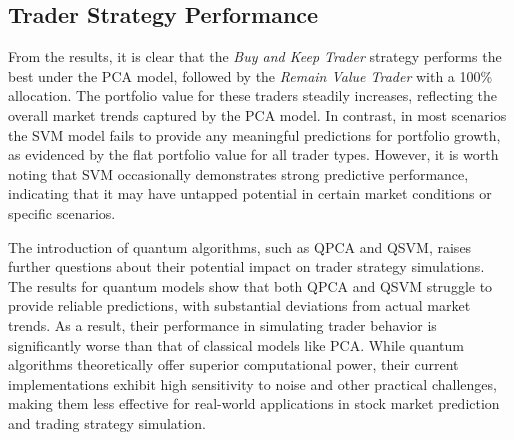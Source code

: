 \documentclass[journal]{IEEEtran}
\begin{document}
\subsection{Trader Strategy Performance}

From the results, it is clear that the \textit{Buy and Keep Trader} strategy performs the best under the PCA model, followed by the \textit{Remain Value Trader} with a 100\% allocation. The portfolio value for these traders steadily increases, reflecting the overall market trends captured by the PCA model. In contrast, in most scenarios the SVM model fails to provide any meaningful predictions for portfolio growth, as evidenced by the flat portfolio value for all trader types. However, it is worth noting that SVM occasionally demonstrates strong predictive performance, indicating that it may have untapped potential in certain market conditions or specific scenarios.

The introduction of quantum algorithms, such as QPCA and QSVM, raises further questions about their potential impact on trader strategy simulations. The results for quantum models show that both QPCA and QSVM struggle to provide reliable predictions, with substantial deviations from actual market trends. As a result, their performance in simulating trader behavior is significantly worse than that of classical models like PCA. While quantum algorithms theoretically offer superior computational power, their current implementations exhibit high sensitivity to noise and other practical challenges, making them less effective for real-world applications in stock market prediction and trading strategy simulation.
\end{document}
